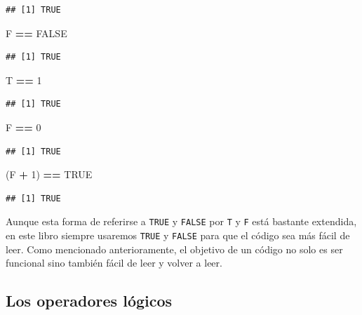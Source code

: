 \documentclass[]{book}
\newenvironment{Shaded}{\begin{snugshade}}{\end{snugshade}}
\newcommand{\DecValTok}[1]{\textcolor[rgb]{0.00,0.00,0.81}{#1}}
\newcommand{\StringTok}[1]{\textcolor[rgb]{0.31,0.60,0.02}{#1}}
\newcommand{\OtherTok}[1]{\textcolor[rgb]{0.56,0.35,0.01}{#1}}
\newcommand{\OperatorTok}[1]{\textcolor[rgb]{0.81,0.36,0.00}{\textbf{#1}}}
\newcommand{\NormalTok}[1]{#1}
\begin{document}
\begin{verbatim}
## [1] TRUE
\end{verbatim}

\begin{Shaded}
\begin{Highlighting}[]
\NormalTok{F }\OperatorTok{==}\StringTok{ }\OtherTok{FALSE}
\end{Highlighting}
\end{Shaded}

\begin{verbatim}
## [1] TRUE
\end{verbatim}

\begin{Shaded}
\begin{Highlighting}[]
\NormalTok{T }\OperatorTok{==}\StringTok{ }\DecValTok{1}
\end{Highlighting}
\end{Shaded}

\begin{verbatim}
## [1] TRUE
\end{verbatim}

\begin{Shaded}
\begin{Highlighting}[]
\NormalTok{F }\OperatorTok{==}\StringTok{ }\DecValTok{0}
\end{Highlighting}
\end{Shaded}

\begin{verbatim}
## [1] TRUE
\end{verbatim}

\begin{Shaded}
\begin{Highlighting}[]
\NormalTok{(F }\OperatorTok{+}\StringTok{ }\DecValTok{1}\NormalTok{) }\OperatorTok{==}\StringTok{ }\OtherTok{TRUE}
\end{Highlighting}
\end{Shaded}

\begin{verbatim}
## [1] TRUE
\end{verbatim}

Aunque esta forma de referirse a \texttt{TRUE} y \texttt{FALSE} por
\texttt{T} y \texttt{F} está bastante extendida, en este libro siempre
usaremos \texttt{TRUE} y \texttt{FALSE} para que el código sea más fácil
de leer. Como mencionado anterioramente, el objetivo de un código no
solo es ser funcional sino también fácil de leer y volver a leer.

\subsection{Los operadores lógicos}\label{l011oplog}
\end{document}
